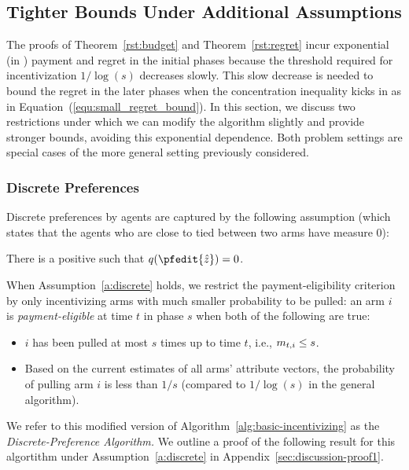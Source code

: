 \subsection{Tighter Bounds Under Additional Assumptions}

The proofs of Theorem~\ref{rst:budget} and Theorem~\ref{rst:regret} incur exponential (in \ARMNUM) payment and regret in the initial phases because the threshold required for incentivization $1/\log(s)$ decreases slowly.
This slow decrease is needed to bound the regret in the later phases when the concentration inequality kicks in as in Equation~(\ref{equ:small_regret_bound}).
In this section, we discuss two restrictions  under which  we can modify the algorithm slightly and provide stronger bounds, avoiding this exponential dependence.
Both problem settings are special cases of the more general  setting previously considered.

\subsubsection{Discrete Preferences}
\label{subsec:discrete}
Discrete preferences by agents are captured by the following assumption (which states that the agents who are close to tied between two arms have measure 0):

\begin{assumption}
\label{a:discrete}
There is a positive  such that
$\AlmostTied{\pfedit{\hat{z}}} = 0$.
\end{assumption}

When Assumption~\ref{a:discrete} holds, we restrict the payment-eligibility criterion by only incentivizing arms with much smaller probability to be pulled: an arm $i$ is \emph{payment-eligible} at time $t$ in phase $s$ when both of the following are true:
\begin{itemize}
\item $i$ has been pulled at most
$s$ times up to time $t$, i.e., $m_{t,i} \leq s$.
\item Based on the current estimates  of all arms' attribute vectors, the probability of pulling arm $i$ is less than $1/s$ (compared to $1/\log(s)$ in the general algorithm).
\end{itemize}

We refer to this modified version of Algorithm~\ref{alg:basic-incentivizing} as the \emph{Discrete-Preference Algorithm.}
We outline a proof of the following result for this algortithm under Assumption~\ref{a:discrete} in Appendix~\ref{sec:discussion-proof1}.

